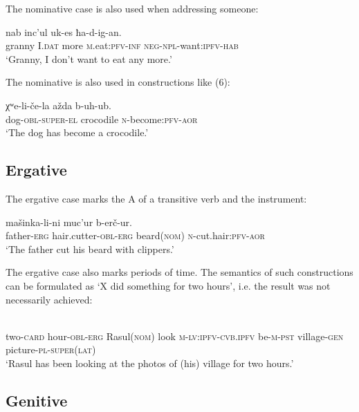 ﻿\documentclass[output=paper]{langsci/langscibook}
\begin{document}
The nominative case is also used when addressing someone:

\ea
{} nab inc'ul uk-es ħa-d-ig-an.\\
granny I.\textsc{dat} more \textsc{m}.eat:\textsc{pfv}-\textsc{inf} \textsc{neg}-\textsc{npl}-want:\textsc{ipfv}-\textsc{hab}\\
\glt `Granny, I don't want to eat any more.'
\z

The nominative is also used in constructions like (6):

\ea
\gll χʷe-li-če-la {ažda} b-uh-ub.\\
dog-\textsc{obl}-\textsc{super}-\textsc{el} crocodile \textsc{n}-become:\textsc{pfv}-\textsc{aor}\\
\glt `The dog has become a crocodile.'
\z

\subsection{Ergative}\label{ergative}

The ergative case marks the A of a transitive verb and the instrument:

\ea
{} {mašinka-li-ni} muc'ur b-erč-ur.\\
father-\textsc{erg} hair.cutter-\textsc{obl}-\textsc{erg} beard(\textsc{nom}) \textsc{n}-cut.hair:\textsc{pfv}-\textsc{aor}\\
\glt `The father cut his beard with clippers.'
\z

The ergative case also marks periods of time. The semantics of such constructions can be formulated as `X did something for two hours', i.e. the result was not necessarily achieved:

\ea
{}\\
two-\textsc{card} hour-\textsc{obl}-\textsc{erg} Rasul(\textsc{nom}) look \textsc{m}-\textsc{lv}:\textsc{ipfv}-\textsc{cvb.ipfv} be-\textsc{m}-\textsc{pst} village-\textsc{gen} picture-\textsc{pl}-\textsc{super}(\textsc{lat})\\
\glt `Rasul has been looking at the photos of (his) village for two hours.'
\z

\subsection{Genitive}
\label{genitive}
\end{document}
